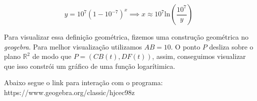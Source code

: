 \[
y = 10^7 (1-10^{-7})^{x} \implies x \approx 10^7 \text{ln}\left(\frac{10^7}{y}\right)
\]

Para visualizar essa definição geométrica, fizemos uma construção geométrica no \textit{geogebra}. Para melhor visualização utilizamos $AB = 10$. O ponto $P$ desliza sobre o plano $\mathbb{R}^2$ de modo que $P = (CB(t), DF(t))$, assim, conseguimos visualizar que isso constrói um gráfico de uma função logarítimica.

Abaixo segue o link para interação com o programa: https://www.geogebra.org/classic/hjcec98z

